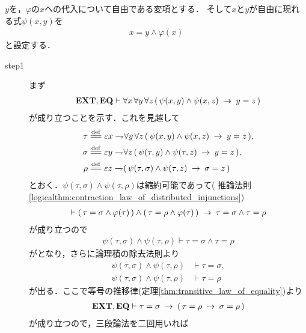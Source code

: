 	\begin{sketch}
		$y$を，$\varphi$の$x$への代入について自由である変項とする．
		そして$x$と$y$が自由に現れる式$\psi(x,y)$を
		\begin{align}
			x = y \wedge \varphi(x)
		\end{align}
		と設定する．
		\begin{description}
			\item[step1]
				まず
				\begin{align}
					\mbox{{\bf EXT}},\mbox{{\bf EQ}} \vdash \forall x\, \forall y\, \forall z\, 
					(\, \psi(x,y) \wedge \psi(x,z) \hspace{0.25em}\rightarrow\hspace{0.25em} y = z\, )
					\label{fom:thm_axiom_of_separation_1}
				\end{align}
				が成り立つことを示す．これを見越して
				\begin{align}
					\tau &\defeq \varepsilon x \negation \forall y\, \forall z\, 
					(\, \psi(x,y) \wedge \psi(x,z) \rarrow y = z\, ), \\
					\sigma &\defeq \varepsilon y \negation \forall z\, 
					(\, \psi(\tau,y) \wedge \psi(\tau,z) \rarrow y = z\, ), \\
					\rho &\defeq \varepsilon z \negation 
					(\, \psi(\tau,\sigma) \wedge \psi(\tau,z) \rarrow \sigma = z\, )
				\end{align}
				とおく．$\psi(\tau,\sigma) \wedge \psi(\tau,\rho)$は縮約可能であって(
				推論法則\ref{logicalthm:contraction_law_of_distributed_injunctions})
				\begin{align}
					\vdash (\, \tau = \sigma \wedge \varphi(\tau)\, )
						\wedge (\, \tau = \rho \wedge \varphi(\tau)\, )
						\hspace{0.25em}\rightarrow\hspace{0.25em} \tau = \sigma \wedge \tau = \rho
				\end{align}
				が成り立つので
				\begin{align}
					\psi(\tau,\sigma) \wedge \psi(\tau,\rho) 
					\vdash \tau = \sigma \wedge \tau = \rho
				\end{align}
				がとなり，さらに論理積の除去法則より
				\begin{align}
					\psi(\tau,\sigma) \wedge \psi(\tau,\rho) &\vdash \tau = \sigma, \\
					\psi(\tau,\sigma) \wedge \psi(\tau,\rho) &\vdash \tau = \rho
				\end{align}
				が出る．ここで等号の推移律(定理\ref{thm:transitive_law_of_equality})より
				\begin{align}
					\mbox{{\bf EXT}},\mbox{{\bf EQ}} \vdash \tau = \sigma \hspace{0.25em}\rightarrow\hspace{0.25em} 
						(\, \tau = \rho \hspace{0.25em}\rightarrow\hspace{0.25em} \sigma = \rho\, )
				\end{align}
				が成り立つので，三段論法を二回用いれば

\end{description}
\end{sketch}
